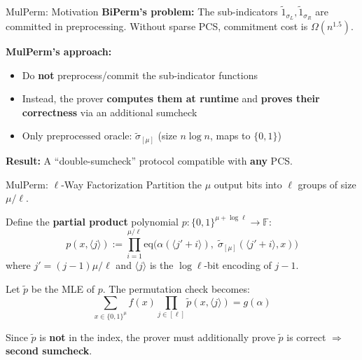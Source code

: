 \documentclass[aspectratio=169,10pt]{beamer}
\newcommand{\F}{\mathbb{F}}
\newcommand{\B}{\{0,1\}}
\newcommand{\eq}{\mathrm{eq}}
\newcommand{\wt}[1]{\widetilde{#1}}
\begin{document}
\begin{frame}{MulPerm: Motivation}
\textbf{BiPerm's problem:} The sub-indicators $\wt{1}_{\sigma_L}, \wt{1}_{\sigma_R}$ are committed in preprocessing. Without sparse PCS, commitment cost is $\Omega(n^{1.5})$.

\vspace{0.8em}
\textbf{MulPerm's approach:}
\begin{itemize}
  \item Do \textbf{not} preprocess/commit the sub-indicator functions
  \item Instead, the prover \textbf{computes them at runtime} and \textbf{proves their correctness} via an additional sumcheck
  \item Only preprocessed oracle: $\wt{\sigma}_{[\mu]}$ (size $n \log n$, maps to $\{0,1\}$)
\end{itemize}

\vspace{0.8em}
\textbf{Result:} A ``double-sumcheck'' protocol compatible with \textbf{any} PCS.
\end{frame}

\begin{frame}{MulPerm: $\ell$-Way Factorization}
Partition the $\mu$ output bits into $\ell$ groups of size $\mu/\ell$.

\vspace{0.3em}
Define the \textbf{partial product} polynomial $p : \B^{\mu + \log\ell} \to \F$:
\[
  p(x, \langle j \rangle) := \prod_{i=1}^{\mu/\ell} \eq\!\bigl(\alpha(\langle j' + i \rangle),\; \wt{\sigma}_{[\mu]}(\langle j'+i \rangle, x)\bigr)
\]
where $j' = (j-1)\mu/\ell$ and $\langle j \rangle$ is the $\log\ell$-bit encoding of $j-1$.

\vspace{0.5em}
Let $\wt{p}$ be the MLE of $p$. The permutation check becomes:
\[
  \boxed{\sum_{x \in \B^\mu} f(x) \prod_{j \in [\ell]} \wt{p}(x, \langle j \rangle) = g(\alpha)}
\]

Since $\wt{p}$ is \textbf{not} in the index, the prover must additionally prove $\wt{p}$ is correct $\Rightarrow$ \textbf{second sumcheck}.
\end{frame}
\end{document}
